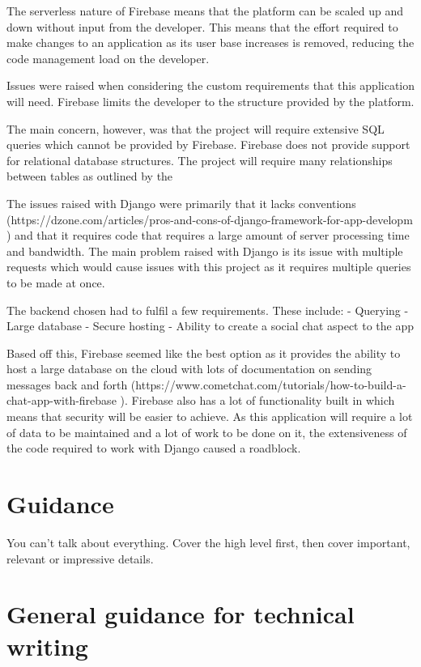 \documentclass{l4proj}
\begin{document}
The serverless nature of Firebase means that the platform can be scaled up and down without input from the developer. This means that the effort required to make changes to an application as its user base increases is removed, reducing the code management load on the developer.

Issues were raised when considering the custom requirements that this application will need. Firebase limits the developer to the structure provided by the platform. 

The main concern, however, was that the project will require extensive SQL queries which cannot be provided by Firebase. Firebase does not provide support for relational database structures. The project will require many relationships between tables as outlined by the 

The issues raised with Django were primarily that it lacks conventions (https://dzone.com/articles/pros-and-cons-of-django-framework-for-app-developm ) and that it requires code that requires a large amount of server processing time and bandwidth. The main problem raised with Django is its issue with multiple requests which would cause issues with this project as it requires multiple queries to be made at once. 

The backend chosen had to fulfil a few requirements. These include:
-	Querying 
-	Large database
-	Secure hosting
-	Ability to create a social chat aspect to the app

Based off this, Firebase seemed like the best option as it provides the ability to host a large database on the cloud with lots of documentation on sending messages back and forth (https://www.cometchat.com/tutorials/how-to-build-a-chat-app-with-firebase ). Firebase also has a lot of functionality built in which means that security will be easier to achieve. As this application will require a lot of data to be maintained and a lot of work to be done on it, the extensiveness of the code required to work with Django caused a roadblock.


\section{Guidance}
You can't talk about everything. Cover the high level first, then cover important, relevant or impressive details.

\section{General guidance for technical writing}
\end{document}
